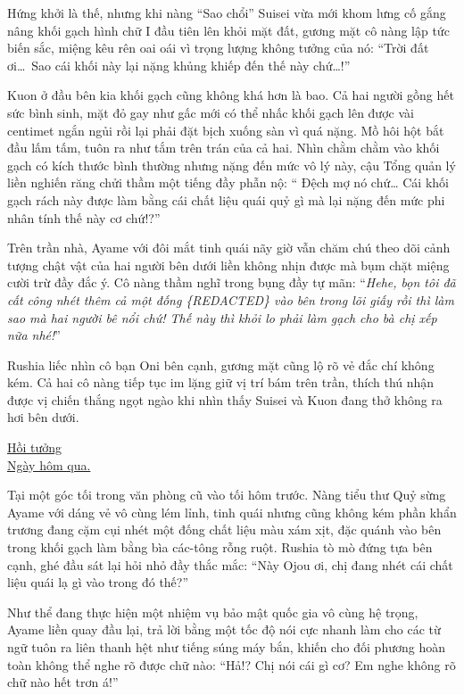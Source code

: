 \documentclass[../main.tex]{subfiles}
\begin{document}
Hứng khởi là thế, nhưng khi nàng ``Sao chổi'' Suisei vừa mới khom lưng cố gắng nâng khối gạch hình chữ I đầu tiên lên khỏi mặt đất, gương mặt cô nàng lập tức biến sắc, miệng kêu rên oai oái vì trọng lượng không tưởng của nó: ``Trời đất ơi\dots\ Sao cái khối này lại nặng khủng khiếp đến thế này chứ\dots!''


Kuon ở đầu bên kia khối gạch cũng không khá hơn là bao. Cả hai người gồng hết sức bình sinh, mặt đỏ gay như gấc mới có thể nhấc khối gạch lên được vài centimet ngắn ngủi rồi lại phải đặt bịch xuống sàn vì quá nặng. Mồ hôi hột bắt đầu lấm tấm, tuôn ra như tắm trên trán của cả hai. Nhìn chằm chằm vào khối gạch có kích thước bình thường nhưng nặng đến mức vô lý này, cậu Tổng quản lý liền nghiến răng chửi thầm một tiếng đầy phẫn nộ: ``{\color{red} Đệch mợ nó chứ\dots} Cái khối gạch rách này được làm bằng cái chất liệu quái quỷ gì mà lại nặng đến mức phi nhân tính thế này cơ chứ!?''

Trên trần nhà, Ayame với đôi mắt tinh quái nãy giờ vẫn chăm chú theo dõi cảnh tượng chật vật của hai người bên dưới liền không nhịn được mà bụm chặt miệng cười trừ đầy đắc ý. Cô nàng thầm nghĩ trong bụng đầy tự mãn: ``\textit{Hehe, bọn tôi đã cất công nhét thêm cả một đống \{REDACTED\} vào bên trong lõi giấy rồi thì làm sao mà hai người bê nổi chứ! Thế này thì khỏi lo phải làm gạch cho bà chị xếp nữa nhé!}''

Rushia liếc nhìn cô bạn Oni bên cạnh, gương mặt cũng lộ rõ vẻ đắc chí không kém. Cả hai cô nàng tiếp tục im lặng giữ vị trí bám trên trần, thích thú nhận được vị chiến thắng ngọt ngào khi nhìn thấy Suisei và Kuon đang thở không ra hơi bên dưới.

\begin{center}
  \uline{Hồi tưởng\\Ngày hôm qua.}
\end{center}


Tại một góc tối trong văn phòng cũ vào tối hôm trước. Nàng tiểu thư Quỷ sừng Ayame với dáng vẻ vô cùng lém lỉnh, tinh quái nhưng cũng không kém phần khẩn trương đang cặm cụi nhét một đống chất liệu màu xám xịt, đặc quánh vào bên trong khối gạch làm bằng bìa các-tông rỗng ruột. Rushia tò mò đứng tựa bên cạnh, ghé đầu sát lại hỏi nhỏ đầy thắc mắc: ``Này Ojou ơi, chị đang nhét cái chất liệu quái lạ gì vào trong đó thế?''

Như thể đang thực hiện một nhiệm vụ bảo mật quốc gia vô cùng hệ trọng, Ayame liền quay đầu lại, trả lời bằng một tốc độ nói cực nhanh làm cho các từ ngữ tuôn ra liên thanh hệt như tiếng súng máy bắn, khiến cho đối phương hoàn toàn không thể nghe rõ được chữ nào: ``Hả!? Chị nói cái gì cơ? Em nghe không rõ chữ nào hết trơn á!''
\end{document}
